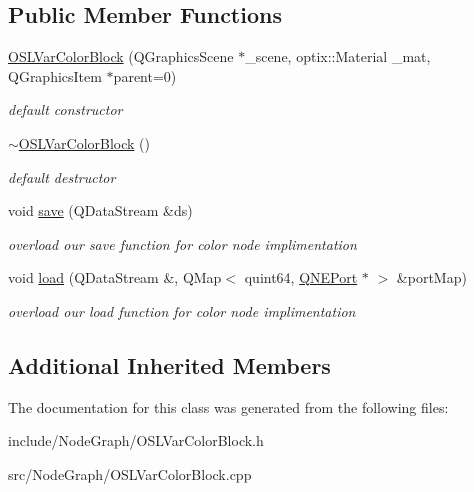 \subsection*{Public Member Functions}
\begin{DoxyCompactItemize}
\item 
\hypertarget{class_o_s_l_var_color_block_a2750ed93bad65dad99b22f02b4ecdfb1}{\hyperlink{class_o_s_l_var_color_block_a2750ed93bad65dad99b22f02b4ecdfb1}{O\-S\-L\-Var\-Color\-Block} (Q\-Graphics\-Scene $\ast$\-\_\-scene, optix\-::\-Material \-\_\-mat, Q\-Graphics\-Item $\ast$parent=0)}\label{class_o_s_l_var_color_block_a2750ed93bad65dad99b22f02b4ecdfb1}

\begin{DoxyCompactList}\small\item\em default constructor \end{DoxyCompactList}\item 
\hypertarget{class_o_s_l_var_color_block_ae28b9a8f3e353f9aca1202620a4e6d3d}{\hyperlink{class_o_s_l_var_color_block_ae28b9a8f3e353f9aca1202620a4e6d3d}{$\sim$\-O\-S\-L\-Var\-Color\-Block} ()}\label{class_o_s_l_var_color_block_ae28b9a8f3e353f9aca1202620a4e6d3d}

\begin{DoxyCompactList}\small\item\em default destructor \end{DoxyCompactList}\item 
\hypertarget{class_o_s_l_var_color_block_a88ef051f6a802de3fde20839fe7b31a9}{void \hyperlink{class_o_s_l_var_color_block_a88ef051f6a802de3fde20839fe7b31a9}{save} (Q\-Data\-Stream \&ds)}\label{class_o_s_l_var_color_block_a88ef051f6a802de3fde20839fe7b31a9}

\begin{DoxyCompactList}\small\item\em overload our save function for color node implimentation \end{DoxyCompactList}\item 
\hypertarget{class_o_s_l_var_color_block_a53261128122303d6f22f0c92d77ef773}{void \hyperlink{class_o_s_l_var_color_block_a53261128122303d6f22f0c92d77ef773}{load} (Q\-Data\-Stream \&, Q\-Map$<$ quint64, \hyperlink{class_q_n_e_port}{Q\-N\-E\-Port} $\ast$ $>$ \&port\-Map)}\label{class_o_s_l_var_color_block_a53261128122303d6f22f0c92d77ef773}

\begin{DoxyCompactList}\small\item\em overload our load function for color node implimentation \end{DoxyCompactList}\end{DoxyCompactItemize}
\subsection*{Additional Inherited Members}


The documentation for this class was generated from the following files\-:\begin{DoxyCompactItemize}
\item 
include/\-Node\-Graph/O\-S\-L\-Var\-Color\-Block.\-h\item 
src/\-Node\-Graph/O\-S\-L\-Var\-Color\-Block.\-cpp\end{DoxyCompactItemize}
